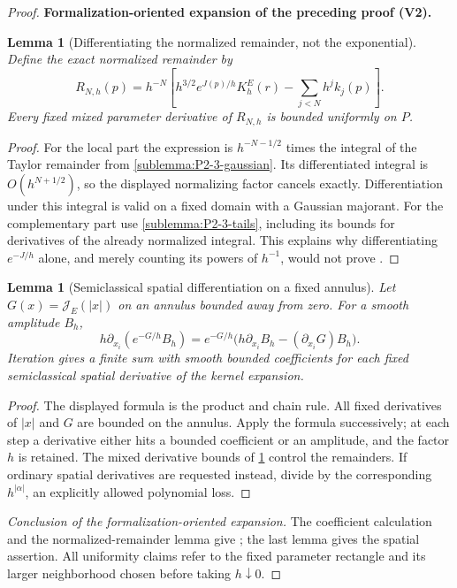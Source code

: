 \documentclass[11pt]{article}
\newtheorem{lemma}[theorem]{Lemma}
\newcommand{\formalisationparentid}{X}
\newenvironment{formalisationaddition}[1]{\par\medskip\begingroup\color{blue}\def\formalisationparentid{#1}\setcounter{formalizationsublemma}{0}\let\lemma\formalizationsublemma\let\endlemma\endformalizationsublemma
  \def\Eo{\mathcal E_h^\circ}\def\EE{\mathcal E_h}\def\phio{\phi_h^\circ}\def\phih{\phi_h}\def\Ho{H_h^{\rm atom}(v^\circ)}\def\Ha{H_h^{\rm atom}}\def\HL{H_h^{L}}\def\Dh{D_h}\def\Log{\operatorname{Log}}\def\ellh{\ell_h}\def\Gp{G_{p,h}}\def\Ast{A_{*,h}}\def\ahat{\widehat{\mathfrak a}_h}\def\ah{\mathfrak a_h}\def\rh{\widehat\rho_h}\def\deltah{\widehat\delta_h}\def\oldref##1{\textup{(##1)}}\def\interface##1{\par\noindent\textit{Analytical interface used here.} ##1\par}\def\finish{\par\noindent\textit{Conclusion of the formalization-oriented expansion.} }\par\noindent\textbf{Formalization-oriented expansion of the preceding proof (V2).}\par\smallskip
}{\par\endgroup\medskip
}
\newcommand{\cJ}{\mathcal J}
\begin{document}
\begin{proof}
\begin{formalisationaddition}{P2.3}
\begin{lemma}[Differentiating the normalized remainder, not the exponential]\label{sublemma:P2-3-normalized-derivatives}
Define the exact normalized remainder by
\[
 R_{N,h}(p)=h^{-N}\left[h^{3/2}e^{J(p)/h}K_h^E(r)
                           -\sum_{j<N}h^jk_j(p)\right].
\]
Every fixed mixed parameter derivative of $R_{N,h}$ is bounded uniformly
on $P$.
\end{lemma}
\begin{proof}
For the local part the expression is $h^{-N-1/2}$ times the integral
of the Taylor remainder from \ref{sublemma:P2-3-gaussian}.
Its differentiated integral is $O(h^{N+1/2})$, so the displayed
normalizing factor cancels exactly. Differentiation under this integral
is valid on a fixed domain with a Gaussian majorant.
For the complementary part use \ref{sublemma:P2-3-tails}, including its
bounds for derivatives of the already normalized integral. This explains
why differentiating $e^{-J/h}$ alone, and merely counting its powers of
$h^{-1}$, would not prove .
\end{proof}

\begin{lemma}[Semiclassical spatial differentiation on a fixed annulus]\label{sublemma:P2-3-spatial-recursion}
Let $G(x)=\cJ_E(|x|)$ on an annulus bounded away from zero. For a smooth
amplitude $B_h$,
\[
 h\partial_{x_i}(e^{-G/h}B_h)
       =e^{-G/h}\bigl(h\partial_{x_i}B_h-(\partial_{x_i}G)B_h\bigr).
\]
Iteration gives a finite sum with smooth bounded coefficients for each
fixed semiclassical spatial derivative of the kernel expansion.
\end{lemma}
\begin{proof}
The displayed formula is the product and chain rule. All fixed derivatives
of $|x|$ and $G$ are bounded on the annulus. Apply the formula successively;
at each step a derivative either hits a bounded coefficient or an amplitude,
and the factor $h$ is retained. The mixed derivative bounds of
\ref{sublemma:P2-3-normalized-derivatives} control the remainders.
If ordinary spatial derivatives are requested instead, divide by the
corresponding $h^{|\alpha|}$, an explicitly allowed polynomial loss.
\end{proof}
\finish The coefficient calculation and the normalized-remainder lemma give
; the last lemma gives the
spatial assertion. All uniformity claims refer to the fixed parameter
rectangle and its larger neighborhood chosen before taking $h\downarrow0$.
\end{formalisationaddition}

\end{proof}
\end{document}
